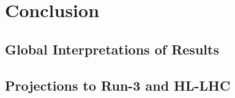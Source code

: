 \section{Conclusion}

\subsection{Global Interpretations of Results}

\subsection{Projections to Run-3 and HL-LHC}
